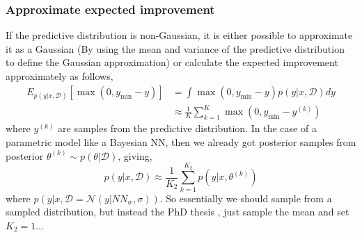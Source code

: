 \subsubsection{Approximate expected improvement}
If the predictive distribution is non-Gaussian, it is either possible to approximate it as a Gaussian
(By using the mean and variance of the predictive distribution to define the Gaussian approximation)
or calculate the expected improvement approximately as follows, 
\begin{align*}
    E_{p(y|x,\mathcal{D})}[\max(0,y_{\min}-y)] &= \int \max(0,y_{\min}-y) p(y|x,\mathcal{D}) dy\\
    &\approx \frac{1}{K} \sum_{k=1}^K  \max(0,y_{\min}-y^{(k)})
\end{align*}
where $y^{(k)}$ are samples from the predictive distribution. In the case of a parametric model
like a Bayesian NN, then we already got posterior samples from posterior $\theta^{(k)} \sim p(\theta | \mathcal{D})$, giving, 
$$p(y|x,\mathcal{D}) \approx \frac{1}{K_2} \sum_{k=1}^{K_2} p(y|x,\theta^{(k)})$$ where
$p(y|x,\mathcal{D} = \mathcal{N}(y|NN_w,\sigma))$. So essentially we should sample from a sampled
distribution, but instead the PhD thesis \cite{PhDthesis}, just sample the mean and set $K_2 = 1$... 





